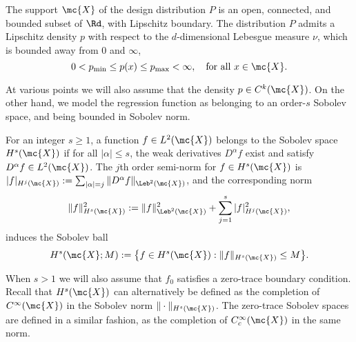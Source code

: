 \begin{definition}
	\label{def:model_flat_euclidean}
	 The support $\mc{X}$ of the design distribution $P$ is an open, connected, and bounded subset of $\Rd$, with Lipschitz boundary. The distribution $P$ admits a Lipschitz density $p$ with respect to the $d$-dimensional Lebesgue measure $\nu$, which is bounded away from $0$ and $\infty$,
	\begin{equation*}
	0 < p_{\min} \leq p(x) \leq p_{\max} < \infty, \quad \textrm{for all $x \in \mc{X}$.}
	\end{equation*}
\end{definition}
At various points we will also assume that the density $p \in C^k(\mc{X})$. On the other hand, we model the regression function as belonging to an order-$s$ Sobolev space, and being bounded in Sobolev norm.
\begin{definition}
	\label{def:sobolev_space}
	For an integer $s \geq 1$, a function $f \in L^2(\mc{X})$ belongs to the Sobolev space $H^s(\mc{X})$ if for all $|\alpha| \leq s$, the weak derivatives $D^{\alpha}f$ exist and satisfy $D^{\alpha}f \in L^2(\mc{X})$. The $j$th order semi-norm for $f \in H^s(\mc{X})$ is $|f|_{H^j(\mc{X})} := \sum_{|\alpha| = j}\|D^{\alpha}f\|_{\Leb^2(\mc{X})}$, and the corresponding norm
	\begin{equation*}
	\|f\|_{H^s(\mc{X})}^2 := \|f\|_{\Leb^2(\mc{X})}^2 + \sum_{j = 1}^{s} |f|_{H^j(\mc{X})}^2,
	\end{equation*}
	induces the Sobolev ball
	\begin{equation*}
	H^s(\mc{X};M) := \bigl\{f \in H^s(\mc{X}): \|f\|_{H^s(\mc{X})} \leq M\bigr\}.
	\end{equation*} 
\end{definition}
When $s > 1$ we will also assume that $f_0$ satisfies a zero-trace boundary condition. Recall that $H^s(\mc{X})$ can alternatively be defined as the completion of $C^{\infty}(\mc{X})$ in the Sobolev norm $\|\cdot\|_{H^s(\mc{X})}$. The zero-trace Sobolev spaces are defined in a similar fashion, as the completion of $C_c^{\infty}(\mc{X})$ in the same norm.

